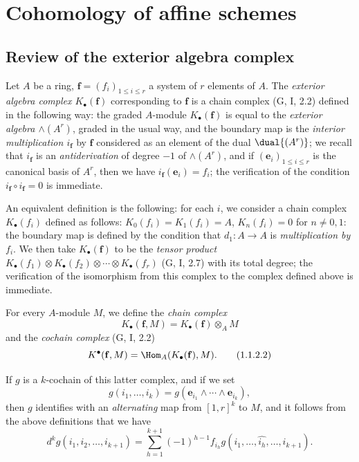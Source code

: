 \section{Cohomology of affine schemes}
\label{section:III.1}

\subsection{Review of the exterior algebra complex}
\label{subsection:III.1.1}

\begin{env}[1.1.1]
\label{III.1.1.1}
Let $A$ be a ring, $\mathbf{f}=(f_i)_{1\leq i\leq r}$ a system of $r$ elements of $A$.
The \emph{exterior algebra complex $K_\bullet(\mathbf{f})$} corresponding to $\mathbf{f}$ is a chain complex (G, I, 2.2) defined in the following way: the graded $A$-module $K_\bullet(\mathbf{f})$ is equal to the \emph{exterior algebra $\wedge(A^r)$}, graded in the usual way, and the boundary map is the \emph{interior multiplication $i_\mathbf{f}$} by $\mathbf{f}$ considered as an element of the dual $\dual{(A^r)}$; we recall that $i_\mathbf{f}$ is an \emph{antiderivation} of degree $-1$ of $\wedge(A^r)$, and if $(\mathbf{e}_i)_{1\leq i\leq r}$ is the canonical basis of $A^r$, then we have $i_\mathbf{f}(\mathbf{e}_i)=f_i$; the verification of the condition $i_\mathbf{f}\circ i_\mathbf{f}=0$ is immediate.

An equivalent definition is the following: for each $i$, we consider a chain complex $K_\bullet(f_i)$ defined as follows: $K_0(f_i)=K_1(f_i)=A$, $K_n(f_i)=0$ for $n\neq 0,1$: the boundary map is defined by the condition that $d_1:A\to A$ is \emph{multiplication by $f_i$}.
We then take $K_\bullet(\mathbf{f})$ to be the \emph{tensor product $K_\bullet(f_1)\otimes K_\bullet(f_2)\otimes\cdots\otimes K_\bullet(f_r)$} (G, I, 2.7) with its total degree; the verification of the isomorphism from this complex to the complex defined above is immediate.
\end{env}

\begin{env}[1.1.2]
\label{III.1.1.2}
For every $A$-module $M$, we define the \emph{chain complex}
\[
\label{III.1.1.2.1}
  K_\bullet(\mathbf{f},M)=K_\bullet(\mathbf{f})\otimes_A M
  \tag{1.1.2.1}
\]
and the \emph{cochain complex} (G, I, 2.2)
\[
\label{III.1.1.2.2}
  K^\bullet(\mathbf{f},M)=\Hom_A(K_\bullet(\mathbf{f}),M).
  \tag{1.1.2.2}
\]

If $g$ is a $k$-cochain of this latter complex, and if we set
\[
  g(i_1,\dots,i_k)=g(\mathbf{e}_{i_1}\wedge\cdots\wedge\mathbf{e}_{i_k}),
\]
then $g$ identifies with an \emph{alternating} map from $[1,r]^k$ to $M$, and it follows from the above definitions that we have
\[
\label{III.1.1.2.3}
  d^k g(i_1,i_2,\dots,i_{k+1})=\sum_{h=1}^{k+1}(-1)^{h-1}f_{i_h}g(i_1,\dots,\widehat{i_h},\dots,i_{k+1}).
  \tag{1.1.2.3}
\]
\end{env}

